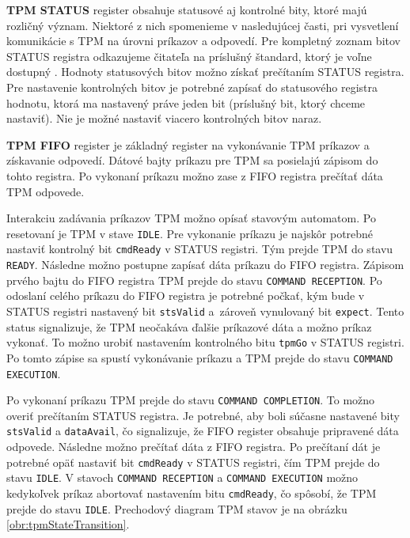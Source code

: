 \textbf{TPM STATUS} register obsahuje statusové aj kontrolné bity, ktoré majú rozličný význam. Niektoré z nich spomenieme v nasledujúcej časti, pri vysvetlení komunikácie s TPM na úrovni príkazov a odpovedí. Pre kompletný zoznam bitov STATUS registra odkazujeme čitateľa na príslušný štandard, ktorý je voľne dostupný \cite{tpmTis}. Hodnoty statusových bitov možno získať prečítaním STATUS registra. Pre nastavenie kontrolných bitov je potrebné zapísať do statusového registra hodnotu, ktorá ma nastavený práve jeden bit (príslušný bit, ktorý chceme nastaviť). Nie je možné nastaviť viacero kontrolných bitov naraz.

\textbf{TPM FIFO} register je základný register na vykonávanie TPM príkazov a získavanie odpovedí. Dátové bajty príkazu pre TPM sa posielajú zápisom do tohto registra. Po vykonaní príkazu možno zase z FIFO registra prečítať dáta TPM odpovede.

Interakciu zadávania príkazov TPM možno opísať stavovým automatom. Po resetovaní je TPM v stave \texttt{IDLE}. Pre vykonanie príkazu je najskôr potrebné nastaviť kontrolný bit \texttt{cmdReady} v STATUS registri. Tým prejde TPM do stavu \texttt{READY}. Následne možno postupne zapísať dáta príkazu do FIFO registra. Zápisom prvého bajtu do FIFO registra TPM prejde do stavu \texttt{COMMAND RECEPTION}. Po odoslaní celého príkazu do FIFO registra je potrebné počkať, kým bude v STATUS registri nastavený bit \texttt{stsValid} a~zároveň vynulovaný bit \texttt{expect}. Tento status signalizuje, že TPM neočakáva ďalšie príkazové dáta a možno príkaz vykonať. To možno urobiť nastavením kontrolného bitu \texttt{tpmGo} v STATUS registri. Po tomto zápise sa spustí vykonávanie príkazu a TPM prejde do stavu \texttt{COMMAND EXECUTION}.

Po vykonaní príkazu TPM prejde do stavu \texttt{COMMAND COMPLETION}. To možno overiť prečítaním STATUS registra. Je potrebné, aby boli súčasne nastavené bity \texttt{stsValid} a \texttt{dataAvail}, čo signalizuje, že FIFO register obsahuje pripravené dáta odpovede. Následne možno prečítať dáta z FIFO registra. Po prečítaní dát je potrebné opäť nastaviť  bit \texttt{cmdReady} v STATUS registri, čím TPM prejde do stavu \texttt{IDLE}. V stavoch \texttt{COMMAND RECEPTION} a \texttt{COMMAND EXECUTION} možno kedykoľvek príkaz abortovať nastavením bitu \texttt{cmdReady}, čo spôsobí, že TPM prejde do stavu \texttt{IDLE}. Prechodový diagram TPM stavov je na obrázku \ref{obr:tpmStateTransition}.

